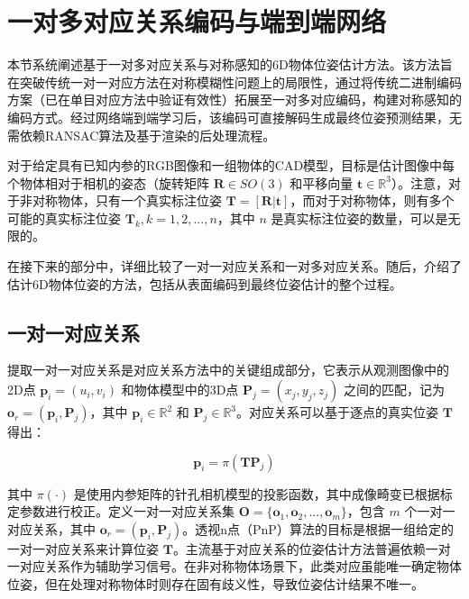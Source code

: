\section{一对多对应关系编码与端到端网络}\label{symnet_方法}

\par 本节系统阐述基于一对多对应关系与对称感知的6D物体位姿估计方法。该方法旨在突破传统一对一对应方法在对称模糊性问题上的局限性，通过将传统二进制编码方案（已在单目对应方法中验证有效性\cite{2024hipose, su2022zebrapose}）拓展至一对多对应编码，构建对称感知的编码方式。经过网络端到端学习后，该编码可直接解码生成最终位姿预测结果，无需依赖RANSAC算法及基于渲染的后处理流程。

\par 对于给定具有已知内参的RGB图像和一组物体的CAD模型，目标是估计图像中每个物体相对于相机的姿态（旋转矩阵 $\bm{R} \in SO(3)$ 和平移向量 $\bm{t} \in \mathbb{R}^3$）。注意，对于非对称物体，只有一个真实标注位姿 $\bm{T}=[\bm{R}|\bm{t}]$，而对于对称物体，则有多个可能的真实标注位姿 $\bm{T}_k, k=1, 2,...,n$，其中 $n$ 是真实标注位姿的数量，可以是无限的。

\par 在接下来的部分中，详细比较了一对一对应关系和一对多对应关系。随后，介绍了估计6D物体位姿的方法，包括从表面编码到最终位姿估计的整个过程。

\subsection{一对一对应关系}

提取一对一对应关系是对应关系方法中的关键组成部分，它表示从观测图像中的2D点 $\bm{p}_i=(u_i,v_i)$ 和物体模型中的3D点 $\bm{P}_j=(x_j,y_j,z_j)$ 之间的匹配，记为 $\bm{o}_r = (\bm{p}_i, \bm{P}_j)$，其中 $\bm{p}_i\in \mathbb{R}^2$ 和 $\bm{P}_j\in \mathbb{R}^3$。对应关系可以基于逐点的真实位姿 $\bm{T}$ 得出：

\begin{equation}
        \bm{p}_i=\pi(\bm{T} \bm{P}_j) 
        \label{eq:projection}
\end{equation}

其中 $\pi(\cdot)$ 是使用内参矩阵的针孔相机模型的投影函数，其中成像畸变已根据标定参数进行校正。定义一对一对应关系集 $\bm{O} = \{\bm{o}_1, \bm{o}_2, ..., \bm{o}_m\}$，包含 $m$ 个一对一对应关系，其中 $\bm{o}_r = (\bm{p}_i, \bm{P}_j)$。透视n点（PnP）算法的目标是根据一组给定的一对一对应关系来计算位姿 $\bm{T}$。主流基于对应关系的位姿估计方法普遍依赖一对一对应关系作为辅助学习信号。在非对称物体场景下，此类对应虽能唯一确定物体位姿，但在处理对称物体时则存在固有歧义性，导致位姿估计结果不唯一。

